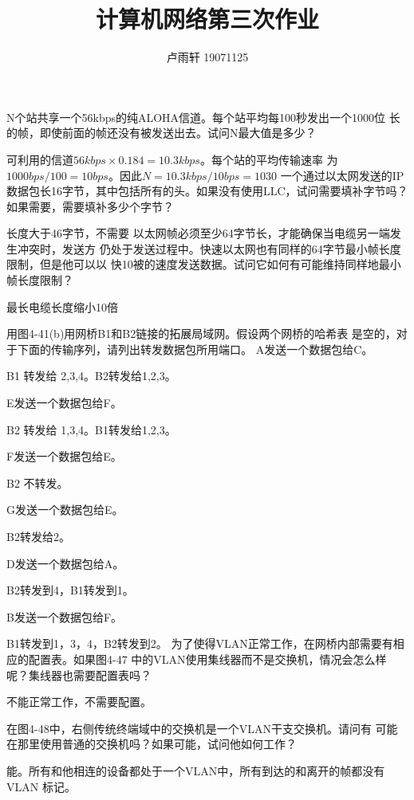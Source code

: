 \documentclass{ctexart}
\title{计算机网络第三次作业}
\author{卢雨轩 19071125}
\begin{document}
\maketitle

\begin{outline}[enumerate]
    \1[2.] N个站共享一个56kbps的纯ALOHA信道。每个站平均每100秒发出一个1000位
    长的帧，即使前面的帧还没有被发送出去。试问N最大值是多少？

    可利用的信道$56kbps \times 0.184 = 10.3kbps$。每个站的平均传输速率
    为$1000bps / 100 = 10bps$。因此$N = 10.3kbps / 10bps = 1030$
    \1[17.] 一个通过以太网发送的IP数据包长16字节，其中包括所有的头。如果没有使用LLC，试问需要填补字节吗？
    如果需要，需要填补多少个字节？

    长度大于46字节，不需要
    \1[18.] 以太网帧必须至少64字节长，才能确保当电缆另一端发生冲突时，发送方
    仍处于发送过程中。快速以太网也有同样的64字节最小帧长度限制，但是他可以以
    快10被的速度发送数据。试问它如何有可能维持同样地最小帧长度限制？

    最长电缆长度缩小10倍

    \1[38.] 用图4-41(b)用网桥B1和B2链接的拓展局域网。假设两个网桥的哈希表
    是空的，对于下面的传输序列，请列出转发数据包所用端口。
        \2 A发送一个数据包给C。

        B1 转发给 2,3,4。B2转发给1,2,3。

        \2 E发送一个数据包给F。

        B2 转发给 1,3,4。B1转发给1,2,3。

        \2 F发送一个数据包给E。

        B2 不转发。

        \2 G发送一个数据包给E。

        B2转发给2。

        \2 D发送一个数据包给A。

        B2转发到4，B1转发到1。

        \2 B发送一个数据包给F。

        B1转发到1，3，4，B2转发到2。
    \1[41.] 为了使得VLAN正常工作，在网桥内部需要有相应的配置表。如果图4-47
    中的VLAN使用集线器而不是交换机，情况会怎么样呢？集线器也需要配置表吗？

    不能正常工作，不需要配置。

    \1[42.] 在图4-48中，右侧传统终端域中的交换机是一个VLAN干支交换机。请问有
    可能在那里使用普通的交换机吗？如果可能，试问他如何工作？

    能。所有和他相连的设备都处于一个VLAN中，所有到达的和离开的帧都没有VLAN 标记。
\end{outline}
\end{document}
